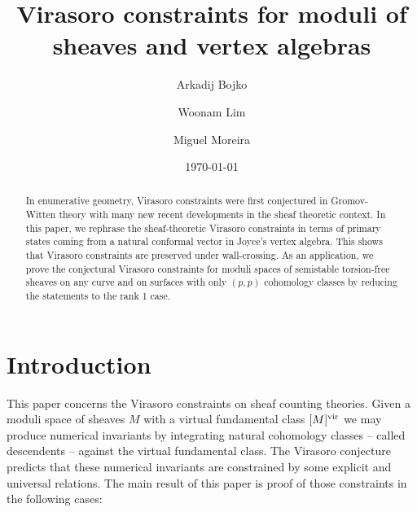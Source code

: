 \documentclass[a4paper, 12pt]{amsart}
\begin{document}
\baselineskip=16pt
\parskip=5pt

    \title{Virasoro constraints for moduli of sheaves and vertex algebras}


\author{Arkadij Bojko}


\author{Woonam Lim}



\author{Miguel Moreira}

\address{ETH Z\"urich, Department of Mathematics, Switzerland}


\date{\today}
\maketitle
\begin{abstract}
  In enumerative geometry, Virasoro constraints were first conjectured in Gromov-Witten theory with many new recent developments in the sheaf theoretic context. In this paper, we rephrase the sheaf-theoretic Virasoro constraints in terms of primary states coming from a natural conformal vector in Joyce’s vertex algebra. This shows that Virasoro constraints are preserved under wall-crossing. As an application, we prove the conjectural Virasoro constraints for moduli spaces of semistable torsion-free sheaves on any curve and on surfaces with only $(p,p)$ cohomology classes by reducing the statements to the rank 1 case.
\end{abstract}
\setcounter{tocdepth}{1} 
\tableofcontents

\section{Introduction}
This paper concerns the Virasoro constraints on sheaf counting theories. Given a moduli space of sheaves $M$ with a virtual fundamental class $[M]^{\mathrm{vir}}$ we may produce numerical invariants by integrating natural cohomology classes -- called descendents -- against the virtual fundamental class. The Virasoro conjecture predicts that these numerical invariants are constrained by some explicit and universal relations. The main result of this paper is proof of those constraints in the following cases: 
\end{document}
